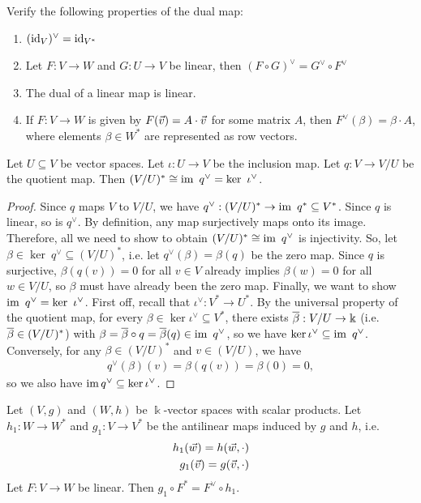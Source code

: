 \begin{exercise}
	Verify the following properties of the dual map:
	\begin{enumerate}
		\item $(\operatorname{id}_V)^\vee = \operatorname{id}_{V^*}$
		\item Let $F : V \to W$ and $G : U \to V$ be linear, then $(F \circ G)^\vee = G^\vee \circ F^\vee$
		\item The dual of a linear map is linear.
		\item If $F : V \to W$ is given by $F(\vec{v}) = A \cdot \vec{v}$ for some matrix $A$, then $F^\vee(\beta) = \beta \cdot A$, where elements $\beta \in W^*$ are represented as row vectors.
	\end{enumerate}
\end{exercise}
\begin{theorem}
	Let $U \subseteq V$ be vector spaces. Let $\iota : U \to V$ be the inclusion map. Let $q : V \to V / U$ be the quotient map. Then $(V / U)^* \cong \operatorname{im}~ q^\vee = \ker~ \iota^\vee$.
\end{theorem}
\begin{proof}
	Since $q$ maps $V$ to $V/U$, we have $q^\vee : (V/U)^* \to \operatorname{im}~ q^* \subseteq V^*$. Since $q$ is linear, so is $q^\vee$. By definition, any map surjectively maps onto its image. Therefore, all we need to show to obtain $(V / U)^* \cong \operatorname{im}~ q^\vee$ is injectivity.
	\newpar
	So, let $\beta \in \ker~ q^\vee \subseteq (V/U)^*$, i.e. let $q^\vee(\beta) = \beta(q)$ be the zero map. Since $q$ is surjective, $\beta(q(v)) = 0$ for all $v \in V$ already implies $\beta(w) = 0$ for all $w \in V/U$, so $\beta$ must have already been the zero map. 
	\newpar
	Finally, we want to show $\operatorname{im}~ q^\vee = \ker~ \iota^\vee$. 
	\newpar
	First off, recall that $\iota^\vee : V^* \to U^*$. By the universal property of the quotient map, for every $\beta \in \ker \iota^\vee \subseteq V^*$, there exists $\overline{{\beta}} : V/U \to \Bbbk$ (i.e. $\overline{{\beta}} \in (V/U)^*$) with $\beta = \overline{{\beta}} \circ q = \overline{{\beta}}(q) \in \operatorname{im}~ q^\vee$, so we have $\ker \iota^\vee \subseteq \operatorname{im}~ q^\vee$.
	\newpar
	Conversely, for any $\beta \in (V/U)^*$ and $v \in (V/U)$, we have
	\begin{align*}
		q^\vee(\beta)(v) = \beta(q(v)) = \beta(0) = 0,
	\end{align*}
	so we also have $\operatorname{im} q^\vee \subseteq \ker \iota^\vee$.
\end{proof}
\begin{importanttheorem}{}{}
	Let $(V,g)$ and $(W,h)$ be $\Bbbk$-vector spaces with scalar products. Let $h_1 : W \to W^*$ and $g_1 : V \to V^*$ be the antilinear maps induced by $g$ and $h$, i.e.
	\begin{align*}
		h_1(\vec{w}) = h(\vec{w}, \cdot)\\
		g_1(\vec{v}) = g(\vec{v}, \cdot)
	\end{align*} 
	Let $F : V \to W$ be linear. Then $g_1 \circ F^* = F^\vee \circ h_1$.
\end{importanttheorem}
